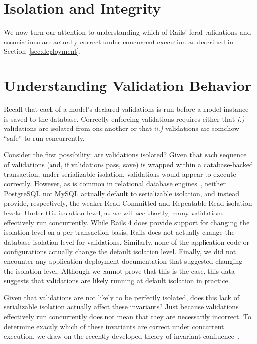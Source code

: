 
\section{Isolation and Integrity}
\label{sec:apps}

We now turn our attention to understanding which of Rails' feral
validations and associations are actually correct under concurrent
execution as described in Section~\ref{sec:deployment}.

\section{Understanding Validation Behavior}

Recall that each of a model's declared validations is run before a
model instance is saved to the database. Correctly enforcing
validations requires either that \textit{i.)} validations are isolated
from one another or that \textit{ii.)} validations are somehow
``safe'' to run concurrently.

Consider the first possibility: are validations isolated? Given that
each sequence of validations (and, if validations pass, save) is
wrapped within a database-backed transaction, under serializable
isolation, validations would appear to execute correctly. However, as
is common in relational database engines~\cite{hat-vldb}, neither
PostgreSQL nor MySQL actually default to serializable isolation, and
instead provide, respectively, the weaker Read Committed and
Repeatable Read isolation levels. Under this isolation level, as we
will see shortly, many validations effectively run concurrently. While
Rails 4 does provide support for changing the isolation level on a
per-transaction basis, Rails does not actually change the database
isolation level for validations. Similarly, none of the application
code or configurations actually change the default isolation
level. Finally, we did not encounter any application deployment
documentation that suggested changing the isolation level. Although we
cannot prove that this is the case, this data suggests that
validations are likely running at default isolation in practice.

Given that validations are not likely to be perfectly isolated, does
this lack of serializable isolation actually affect these invariants?
Just because validations effectively run concurrently does not mean
that they are necessarily incorrect. To determine exactly which of
these invariants are correct under concurrent execution, we draw on
the recently developed theory of invariant
confluence~\cite{coord-avoid}.

